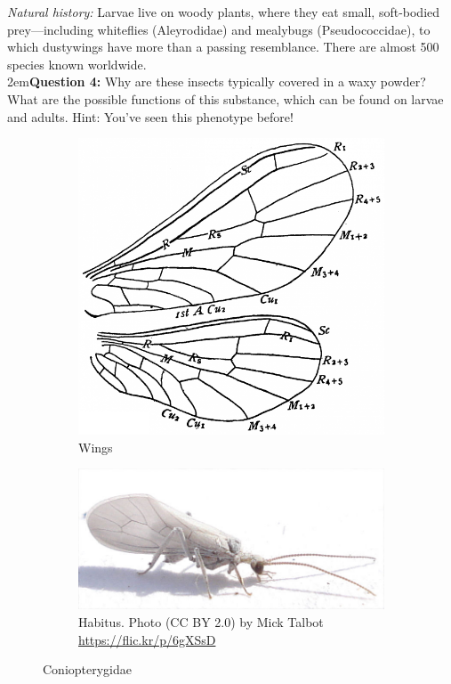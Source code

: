 \documentclass[letterpaper, 11pt]{article}
\begin{document}
\noindent{}\textit{Natural history:} Larvae live on woody plants, where they eat small, soft-bodied prey---including whiteflies (Aleyrodidae) and mealybugs (Pseudococcidae), to which dustywings have more than a passing resemblance. There are almost 500 species known worldwide. \\

\hangindent2em\textbf{Question 4:}  Why are these insects typically covered in a waxy powder? What are the possible functions of this substance, which can be found on larvae and adults. Hint: You've seen this phenotype before!\\

\begin{figure}[ht!]
    \centering
    \begin{subfigure}[ht!]{0.34\textwidth}
        \includegraphics[width=\textwidth]{figures/ConiopterygidWing}
        \caption{Wings \citep[][Fig. 211]{comstock1918wings}}
        \label{fig:coniopterygid1}
    \end{subfigure}
    \qquad
    \begin{subfigure}[ht!]{0.5\textwidth}
        \includegraphics[width=\textwidth]{figures/ConiopterygidHabitus}
        \caption{Habitus. Photo (CC BY 2.0) by Mick Talbot \url{https://flic.kr/p/6gXSsD}}
        \label{fig:coniopterygid2}
    \end{subfigure}
    \caption{Coniopterygidae}\label{fig:coniopterygids}
\end{figure}
\end{document}
